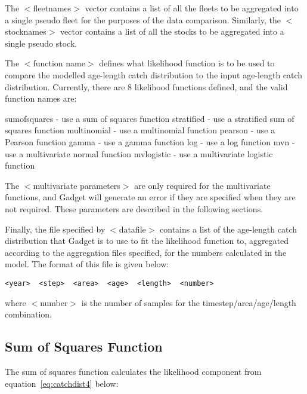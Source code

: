 \documentclass[10pt,twoside]{book}
\begin{document}
\bigskip
The $<$fleetnames$>$ vector contains a list of all the fleets to be aggregated into a single pseudo fleet for the purposes of the data comparison.  Similarly, the $<$stocknames$>$ vector contains a list of all the stocks to be aggregated into a single pseudo stock.

\bigskip
The $<$function name$>$ defines what likelihood function is to be used to compare the modelled age-length catch distribution to the input age-length catch distribution.  Currently, there are 8 likelihood functions defined, and the valid function names are:

\bigskip
sumofsquares - use a sum of squares function\newline
stratified - use a stratified sum of squares function\newline
multinomial - use a multinomial function\newline
pearson - use a Pearson function\newline
gamma - use a gamma function\newline
log - use a log function\newline
mvn - use a multivariate normal function\newline
mvlogistic - use a multivariate logistic function

\bigskip
The $<$multivariate parameters$>$ are only required for the multivariate functions, and Gadget will generate an error if they are specified when they are not required.  These parameters are described in the following sections.

\bigskip
Finally, the file specified by $<$datafile$>$ contains a list of the age-length catch distribution that Gadget is to use to fit the likelihood function to, aggregated according to the aggregation files specified, for the numbers calculated in the model.  The format of this file is given below:

{\small\begin{verbatim}
<year>  <step>  <area>  <age>  <length>  <number>
\end{verbatim}}

where $<$number$>$ is the number of samples for the timestep/area/age/length combination.

\subsection{Sum of Squares Function}
The sum of squares function calculates the likelihood component from equation~\ref{eq:catchdist4} below:
\end{document}
